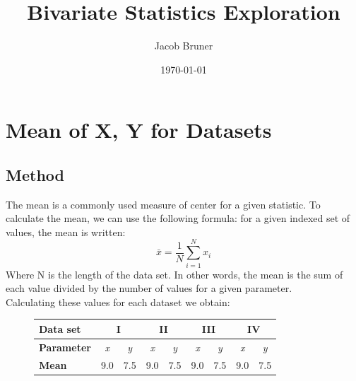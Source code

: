 \documentclass[11pt,a4paper]{article}
\author{Jacob Bruner}
\title{Bivariate Statistics Exploration}
\date{\today}
\begin{document}
\maketitle

\section{Mean of X, Y for Datasets}
\subsection{Method}
The mean is a commonly used measure of center for a given statistic. To calculate the mean, we can use the following formula: for a given indexed set of values, the mean is written:
\[
\bar{x} = \frac{1}{N} \sum_{i = 1}^{N} x_i
\]
Where N is the length of the data set. In other words, the mean is the sum of each value divided by the number of values for a given parameter. \\


Calculating these values for each dataset we obtain:

\begin{figure}[ht]
\centering
\begin{tabular}{|l|cc|cc|cc|cc|}
\hline
\textbf{Data set}         & \multicolumn{2}{c|}{\textbf{I}}              & \multicolumn{2}{c|}{\textbf{II}}             & \multicolumn{2}{c|}{\textbf{III}}            & \multicolumn{2}{c|}{\textbf{IV}}             \\ \hline
\textbf{Parameter} & \multicolumn{1}{c|}{\textit{x}} & \textit{y} & \multicolumn{1}{c|}{\textit{x}} & \textit{y} & \multicolumn{1}{c|}{\textit{x}} & \textit{y} & \multicolumn{1}{c|}{\textit{x}} & \textit{y} \\ \hline
\textbf{Mean}     & \multicolumn{1}{c|}{9.0}        & 7.5        & \multicolumn{1}{c|}{9.0}        & 7.5        & \multicolumn{1}{c|}{9.0}        & 7.5        & \multicolumn{1}{c|}{9.0}        & 7.5        \\ \hline
\end{tabular}
\end{figure}
\end{document}
